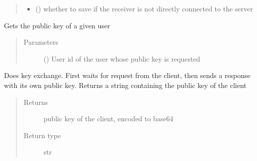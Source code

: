 \documentclass[letterpaper,10pt,english]{sphinxmanual}
\begin{document}
\begin{fulllineitems}
\begin{fulllineitems}
\begin{quote}
\begin{description}
\begin{itemize}
\item {} 
 () \textendash{} whether to save if the receiver is not directly connected to the server

\end{itemize}

\end{description}\end{quote}

\end{fulllineitems}


\begin{fulllineitems}
\label{\detokenize{Message:Message.Message._send_rcvr_key}}
Gets the public key of a given user
\begin{quote}\begin{description}
\item[{Parameters}] \leavevmode
{} () \textendash{} User id of the user whose public key is requested

\end{description}\end{quote}

\end{fulllineitems}


\begin{fulllineitems}
\label{\detokenize{Message:Message.Message.keyex}}
Does key exchange. First waits for request from the client, then sends a response with its own public key. Returns a string containing the public key of the client
\begin{quote}\begin{description}
\item[{Returns}] \leavevmode
public key of the client, encoded to base64

\item[{Return type}] \leavevmode
str


\end{description}
\end{quote}
\end{fulllineitems}
\end{fulllineitems}
\end{document}
